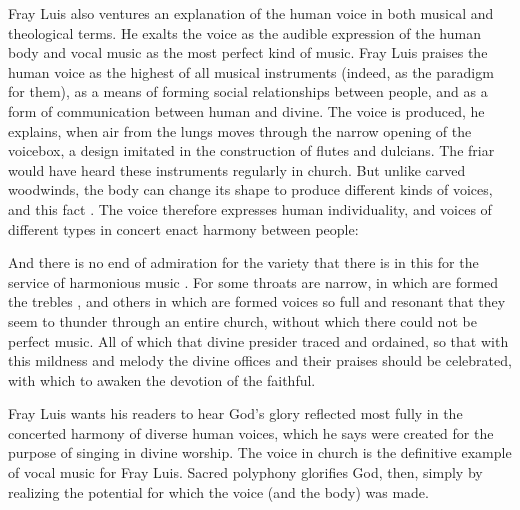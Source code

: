 Fray Luis also ventures an explanation of the human voice in both musical and
theological terms.
He exalts the voice as the audible expression of the human body and
vocal music as the most perfect kind of music.%
    \Autocite[243]{LuisdeGranada:Simbolo} 
Fray Luis praises the human voice as the highest of all musical instruments
(indeed, as the paradigm for them), as a means of forming social relationships
between people, and as a form of communication between human and divine.
The voice is produced, he explains, when air from the lungs moves through the
narrow opening of the voicebox, a design imitated in the construction of flutes
and dulcians.
The friar would have heard these instruments regularly in church.
But unlike carved woodwinds, the body can change its shape to produce
different kinds of voices, and this fact .%
    \Autocite[252]{LuisdeGranada:Simbolo}
The voice therefore expresses human individuality, and voices of different
types in concert enact harmony between people: 
\begin{quoting} 
    And there is no end of admiration for the variety that there is in this for
    the service of harmonious music .  
    For some throats are narrow, in which are formed the trebles
    , and others in which are formed voices so full and
    resonant that they seem to thunder through an entire church, without which
    there could not be perfect music.
    All of which that divine presider traced and ordained, so that with this
    mildness and melody the divine offices and their praises should be
    celebrated, with which to awaken the devotion of the faithful.%
        \Autocite[252]{LuisdeGranada:Simbolo} 
\end{quoting}
Fray Luis wants his readers to hear God's glory reflected most fully in the
concerted harmony of diverse human voices, which he says were created for the
purpose of singing in divine worship.
The voice in church is the definitive example of vocal music for Fray Luis.
Sacred polyphony glorifies God, then, simply by realizing the potential for
which the voice (and the body) was made.

